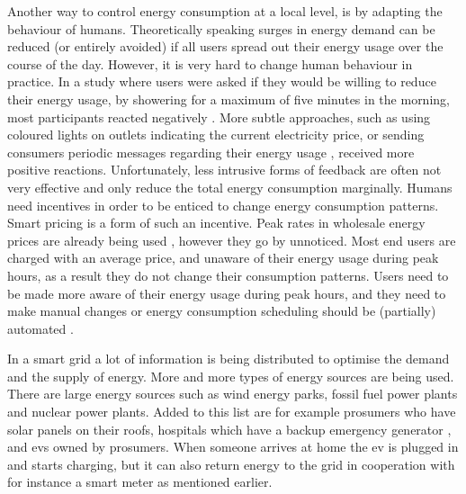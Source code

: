 Another way to control energy consumption at a local level, is by adapting the behaviour of humans. Theoretically speaking surges in energy demand can be reduced (or entirely avoided) if all users spread out their energy usage over the course of the day. However, it is very hard to change human behaviour in practice. In a study where users were asked if they would be willing to reduce their energy usage, by showering for a maximum of five minutes in the morning, most participants reacted negatively \cite{GouldenBedwellRennick-EgglestoneEtAl2014}. More subtle approaches, such as using coloured lights on outlets indicating the current electricity price, or sending consumers periodic messages regarding their energy usage \cite{AyresRasemanShih2012}, received more positive reactions. Unfortunately, less intrusive forms of feedback are often not very effective and only reduce the total energy consumption marginally. Humans need incentives in order to be enticed to change energy consumption patterns. Smart pricing is a form of such an incentive. Peak rates in wholesale energy prices are already being used \cite{SamadiMohsenian-RadSchoberEtAl2012}, however they go by unnoticed. Most end users are charged with an average price, and unaware of their energy usage during peak hours, as a result they do not change their consumption patterns. Users need to be made more aware of their energy usage during peak hours, and they need to make manual changes \cite{Mohsenian-RadLeon-Garcia2010} or energy consumption scheduling should be (partially) automated \cite{SamadiMohsenian-RadSchoberEtAl2012}.

In a smart grid a lot of information is being distributed to optimise the demand and the supply of energy. More and more types of energy sources are being used. There are large energy sources such as wind energy parks, fossil fuel power plants and nuclear power plants. Added to this list are for example prosumers who have solar panels on their roofs, hospitals which have a backup emergency generator \cite{Kumagai2012}, and \acp{ev} owned by prosumers. When someone arrives at home the \ac{ev} is plugged in and starts charging, but it can also return energy to the grid in cooperation with for instance a smart meter as mentioned earlier.

